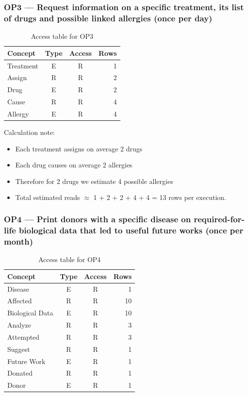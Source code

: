 \documentclass[11pt,a4paper]{article}
\begin{document}
\subsubsection*{OP3 — Request information on a specific treatment, its list of drugs and possible linked allergies (once per day)}
\begin{table}[H]
\centering
\begin{tabular}{|l|c|c|r|}
\hline
\textbf{Concept} & \textbf{Type} & \textbf{Access} & \textbf{Rows} \\
\hline
Treatment & E & R & 1 \\
Assign & R & R & 2 \\
Drug & E & R & 2 \\
Cause & R & R & 4 \\
Allergy & E & R & 4 \\
\hline
\end{tabular}
\caption{Access table for OP3}
\end{table}

Calculation note:
\begin{itemize}
  \item Each treatment assigns on average 2 drugs
  \item Each drug causes on average 2 allergies
  \item Therefore for 2 drugs we estimate 4 possible allergies
  \item Total estimated reads $\approx$ 1 + 2 + 2 + 4 + 4 = 13 rows per execution.
\end{itemize}


\subsubsection*{OP4 — Print donors with a specific disease on required-for-life biological data that led to useful future works (once per month)}
\begin{table}[H]
\centering
\begin{tabular}{|l|c|c|r|}
\hline
  	\textbf{Concept} & \textbf{Type} & \textbf{Access} & \textbf{Rows} \\
\hline
Disease & E & R & 1 \\
Affected & R & R & 10 \\
Biological Data & E & R & 10 \\
Analyze & R & R & 3 \\
Attempted & R & R & 3 \\
Suggest & R & R & 1 \\
Future Work & E & R & 1 \\
Donated & R & R & 1 \\
Donor & E & R & 1 \\
\hline
\end{tabular}
\caption{Access table for OP4}
\end{table}
\end{document}
